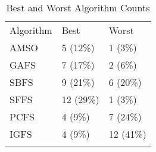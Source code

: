 \begin{table}
\caption{Best and Worst Algorithm Counts}
\label{tbl:best:worst:count}
\begin{tabular}{lll}
\noalign{\smallskip}\hline\noalign{\smallskip}
Algorithm&Best&Worst\\
\noalign{\smallskip}\hline
AMSO&5 (12\%)&1 (3\%)\\
GAFS&7 (17\%)&2 (6\%)\\
SBFS&9 (21\%)&6 (20\%)\\
SFFS&12 (29\%)&1 (3\%)\\
PCFS&4 (9\%)&7 (24\%)\\
IGFS&4 (9\%)&12 (41\%)\\
\noalign{\smallskip}\hline
\end{tabular}
\end{table}
